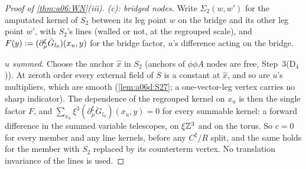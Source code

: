 \begin{proof}[Proof of \cref{thm:a06:WN}\textup{(iii)}]
\emph{(c): bridged nodes.} Write $\Sigma_2(w,w')$ for the amputated kernel of $S_2$ between its leg point $w$ on the bridge and its other leg point $w'$, with $S_2$'s lines (walled or not, at the regrouped scale), and $F(y):=(\partial^\xi_\mu\breve G_{l_0})(x_u,y)$ for the bridge factor, $u$'s difference acting on the bridge.

\emph{$u$ summed.} Choose the anchor $\hat x$ in $S_2$ (anchors of $\phi\phi A$ nodes are free, Step~3(D$_4$)). At zeroth order every external field of $S$ is a constant at $\hat x$, and so are $u$'s multipliers, which are smooth (\cref{lem:a06d:S27}; a one-vector-leg vertex carries no sharp indicator). The dependence of the regrouped kernel on $x_u$ is then the single factor $F$, and $\sum_{x_u}\xi^3(\partial^\xi_\mu\breve G_{l_0})(x_u,y)=0$ for every summable kernel: a forward difference in the summed variable telescopes, on $\xi\mathbb Z^3$ and on the torus. So $c=0$ for every member and any line kernels, before any $C^\xi/R$ split, and the same holds for the member with $S_2$ replaced by its counterterm vertex. No translation invariance of the lines is used.


\end{proof}

